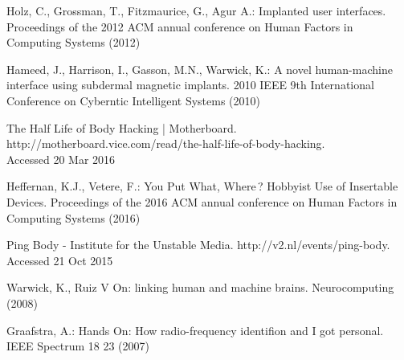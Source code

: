 \documentclass[runningheads,a4paper]{llncs}
\begin{document}
\begin{thebibliography}{7}

 Holz, C., Grossman, T., Fitzmaurice, G., Agur A.: Implanted user interfaces. Proceedings of the 2012 ACM annual conference on Human Factors in Computing Systems (2012)

 Hameed, J., Harrison, I., Gasson, M.N., Warwick, K.: A novel human-machine interface using subdermal magnetic implants. 2010 IEEE 9th International Conference on Cyberntic Intelligent Systems (2010)

 The Half Life of Body Hacking | Motherboard.\\ http://motherboard.vice.com/read/the-half-life-of-body-hacking.\\ Accessed 20 Mar 2016

 Heffernan, K.J., Vetere, F.: You Put What, Where ? Hobbyist Use of Insertable Devices. Proceedings of the 2016 ACM annual conference on Human Factors in Computing Systems (2016)

 Ping Body - Institute for the Unstable Media. http://v2.nl/events/ping-body. Accessed 21 Oct 2015

 Warwick, K., Ruiz V On: linking human and machine brains. Neurocomputing (2008)

 Graafstra, A.: Hands On: How radio-frequency identifion and I got personal. IEEE Spectrum 18 23 (2007)

\end{thebibliography}
\end{document}
